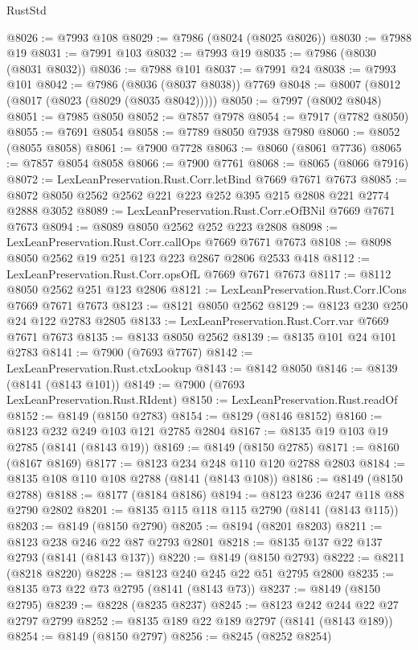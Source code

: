 \begin{lexlean}{RustStd}
\begin{coremodule}
@8026 := @7993 @108
@8029 := @7986 (@8024 (@8025 @8026))
@8030 := @7988 @19
@8031 := @7991 @103
@8032 := @7993 @19
@8035 := @7986 (@8030 (@8031 @8032))
@8036 := @7988 @101
@8037 := @7991 @24
@8038 := @7993 @101
@8042 := @7986 (@8036 (@8037 @8038)) @7769
@8048 := @8007 (@8012 (@8017 (@8023 (@8029 (@8035 @8042)))))
@8050 := @7997 (@8002 @8048)
@8051 := @7985 @8050
@8052 := @7857 @7978
@8054 := @7917 (@7782 @8050)
@8055 := @7691 @8054
@8058 := @7789 @8050 @7938 @7980
@8060 := @8052 (@8055 @8058)
@8061 := @7900 @7728
@8063 := @8060 (@8061 @7736)
@8065 := @7857 @8054 @8058
@8066 := @7900 @7761
@8068 := @8065 (@8066 @7916)
@8072 := LexLeanPreservation.Rust.Corr.letBind @7669 @7671 @7673
@8085 := @8072 @8050 @2562 @2562 @221 @223 @252 @395 @215 @2808 @221 @2774 @2888 @3052
@8089 := LexLeanPreservation.Rust.Corr.eOfBNil @7669 @7671 @7673
@8094 := @8089 @8050 @2562 @252 @223 @2808
@8098 := LexLeanPreservation.Rust.Corr.callOps @7669 @7671 @7673
@8108 := @8098 @8050 @2562 @19 @251 @123 @223 @2867 @2806 @2533 @418
@8112 := LexLeanPreservation.Rust.Corr.opsOfL @7669 @7671 @7673
@8117 := @8112 @8050 @2562 @251 @123 @2806
@8121 := LexLeanPreservation.Rust.Corr.lCons @7669 @7671 @7673
@8123 := @8121 @8050 @2562
@8129 := @8123 @230 @250 @24 @122 @2783 @2805
@8133 := LexLeanPreservation.Rust.Corr.var @7669 @7671 @7673
@8135 := @8133 @8050 @2562
@8139 := @8135 @101 @24 @101 @2783
@8141 := @7900 (@7693 @7767)
@8142 := LexLeanPreservation.Rust.ctxLookup
@8143 := @8142 @8050
@8146 := @8139 (@8141 (@8143 @101))
@8149 := @7900 (@7693 LexLeanPreservation.Rust.RIdent)
@8150 := LexLeanPreservation.Rust.readOf
@8152 := @8149 (@8150 @2783)
@8154 := @8129 (@8146 @8152)
@8160 := @8123 @232 @249 @103 @121 @2785 @2804
@8167 := @8135 @19 @103 @19 @2785 (@8141 (@8143 @19))
@8169 := @8149 (@8150 @2785)
@8171 := @8160 (@8167 @8169)
@8177 := @8123 @234 @248 @110 @120 @2788 @2803
@8184 := @8135 @108 @110 @108 @2788 (@8141 (@8143 @108))
@8186 := @8149 (@8150 @2788)
@8188 := @8177 (@8184 @8186)
@8194 := @8123 @236 @247 @118 @88 @2790 @2802
@8201 := @8135 @115 @118 @115 @2790 (@8141 (@8143 @115))
@8203 := @8149 (@8150 @2790)
@8205 := @8194 (@8201 @8203)
@8211 := @8123 @238 @246 @22 @87 @2793 @2801
@8218 := @8135 @137 @22 @137 @2793 (@8141 (@8143 @137))
@8220 := @8149 (@8150 @2793)
@8222 := @8211 (@8218 @8220)
@8228 := @8123 @240 @245 @22 @51 @2795 @2800
@8235 := @8135 @73 @22 @73 @2795 (@8141 (@8143 @73))
@8237 := @8149 (@8150 @2795)
@8239 := @8228 (@8235 @8237)
@8245 := @8123 @242 @244 @22 @27 @2797 @2799
@8252 := @8135 @189 @22 @189 @2797 (@8141 (@8143 @189))
@8254 := @8149 (@8150 @2797)
@8256 := @8245 (@8252 @8254)

\end{coremodule}
\end{lexlean}
